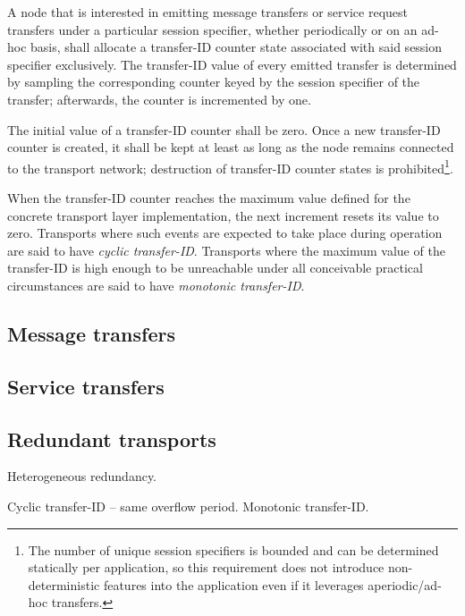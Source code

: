 A node that is interested in emitting message transfers or service request transfers
under a particular session specifier, whether periodically or on an ad-hoc basis,
shall allocate a transfer-ID counter state associated with said session specifier exclusively.
The transfer-ID value of every emitted transfer is determined by sampling the corresponding counter
keyed by the session specifier of the transfer; afterwards, the counter is incremented by one.

The initial value of a transfer-ID counter shall be zero.
Once a new transfer-ID counter is created,
it shall be kept at least as long as the node remains connected to the transport network;
destruction of transfer-ID counter states is prohibited\footnote{%
    The number of unique session specifiers is bounded and can be determined statically per application,
    so this requirement does not introduce non-deterministic features into the application even if it leverages
    aperiodic/ad-hoc transfers.
}.

When the transfer-ID counter reaches the maximum value defined for the concrete transport layer implementation,
the next increment resets its value to zero.
Transports where such events are expected to take place during operation are said to have \emph{cyclic transfer-ID}.
Transports where the maximum value of the transfer-ID is high enough to be unreachable under all conceivable
practical circumstances are said to have \emph{monotonic transfer-ID}.

\subsection{Message transfers}


\subsection{Service transfers}


\subsection{Redundant transports}

Heterogeneous redundancy.

Cyclic transfer-ID -- same overflow period. Monotonic transfer-ID.
